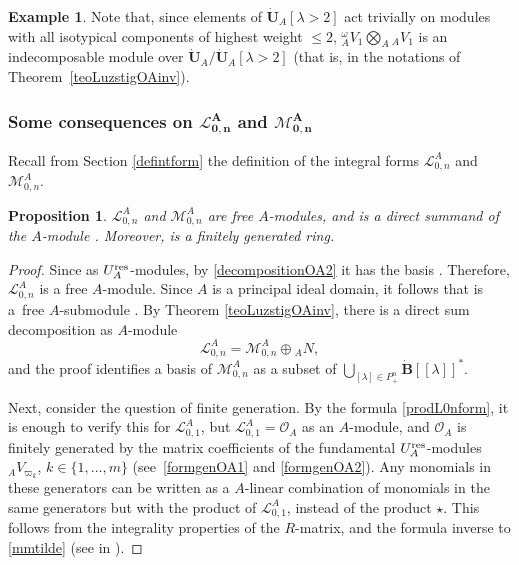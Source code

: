 \documentclass[pdftex]{sigma}
\numberwithin{equation}{section}
\newtheorem{prop}[teo]{Proposition}
\theoremstyle{definition}
\newtheorem{exa}[teo]{Example}
\newcommand{\Ll}{{\mathcal L}}
\newcommand{\Mm}{{\mathcal M}}
\newcommand{\Oo}{{\mathcal O}}
\begin{document}
\begin{exa}
{Note that, since elements of $\dot{\mathbf{U}}_A [\lambda > 2]$ act trivially on modules with all isotypical components of highest weight $\leq 2$, ${}_A^\omega V_1\bigotimes_A {}_AV_1$ is an indecomposable module over $\dot{\mathbf{U}}_A / \dot{\mathbf{U}}_A [\lambda > 2]$ (that is,  in the notations of Theorem~\ref{teoLuzstigOAinv}).}\end{exa}

\subsubsection[Some consequences on L\_{0,n}\^A and M\_{0,n}\^A]{Some consequences on $\boldsymbol{\Ll_{0,n}^A}$ and $\boldsymbol{\Mm_{0,n}^A}$}

Recall from Section \ref{defintform} the definition of the integral forms $\Ll_{0,n}^A$ and $\Mm_{0,n}^A$.
\begin{prop}\label{L0NAfgfree} $\Ll_{0,n}^A$ and $\Mm_{0,n}^A$ are free $A$-modules, and \smash{$\Mm_{0,n}^A$} is a direct summand of the $A$-module \smash{$\Ll_{0,n}^A$}. Moreover, \smash{$\Ll_{0,n}^A$} is a finitely generated ring.
\end{prop}
\begin{proof} Since \smash{$\Ll_{0,n}^A = \Oo_A^{\otimes n}$} as $U_A^{\rm res}$-modules, by \eqref{decompositionOA2} it has the basis . Therefore, $\Ll_{0,n}^A$ is a free $A$-module. Since $A$ is a principal ideal domain, it follows that \smash{$\Mm_{0,n}^A$} is a~free $A$-submodule \cite[Appendix~2.2]{Lang}. By Theorem \ref{teoLuzstigOAinv}, there is a direct sum decomposition as $A$-module
\begin{equation}\label{decomposition OAn}
\Ll_{0,n}^A = \Mm_{0,n}^A \oplus {}_AN,
\end{equation} and the proof identifies a basis of $\Mm_{0,n}^A$ as a subset of $\bigcup_{[\lambda]\in P_+^n}\dot{\mathbf{B}} [[\lambda]]^*$.

Next, consider the question of finite generation. By the formula \eqref{prodL0nform}, it is enough to verify this for ${\mathcal L}_{0,1}^A$, but ${\mathcal L}_{0,1}^A= \Oo_A$ as an $A$-module, and $\Oo_A$ is finitely generated by the matrix coefficients of the fundamental $U_A^{\rm res}$-modules ${}_AV_{\varpi_k}$, $k\in\{1,\dots,m\}$ (see~\eqref{formgenOA1} and \eqref{formgenOA2}). Any monomials in these generators can be written as a $A$-linear combination of monomials in the same generators but with the product of $\Ll_{0,1}^A$, instead of the product $\star$. This follows from the integrality properties of the $R$-matrix, and the formula inverse to \eqref{mmtilde} (see in \cite[Section 3.3 and the formulas (4.6)--(4.8)]{BR}).
\end{proof}
\end{document}
